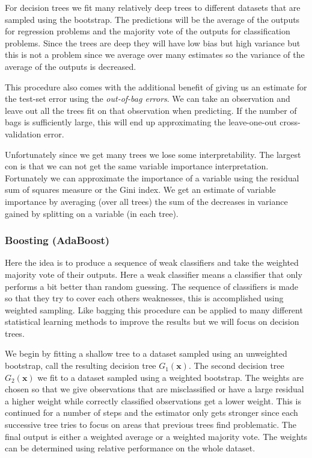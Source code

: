 \documentclass[a4paper, 12pt]{scrartcl}
\newcommand{\bfx}{\mathbf{x}}
\begin{document}
\begin{algorithm}
	For decision trees we fit many relatively deep trees to different datasets that are sampled using the bootstrap.
	The predictions will be the average of the outputs for regression problems and the majority vote of the outputs for classification problems.
	Since the trees are deep they will have low bias but high variance but this is not a problem since we average over many estimates so the variance of the average of the outputs is decreased.
	
	This procedure also comes with the additional benefit of giving us an estimate for the test-set error using the \emph{out-of-bag errors}.
	We can take an observation and leave out all the trees fit on that observation when predicting.
	If the number of bags is sufficiently large, this will end up approximating the leave-one-out cross-validation error.
\end{algorithm}

Unfortunately since we get many trees we lose some interpretability.
The largest con is that we can not get the same variable importance interpretation.
Fortunately we can approximate the importance of a variable using the residual sum of squares measure or the Gini index.
We get an estimate of variable importance by averaging (over all trees) the sum of the decreases in variance gained by splitting on a variable (in each tree).

\subsubsection*{Boosting (AdaBoost)}
Here the idea is to produce a sequence of weak classifiers and take the weighted majority vote of their outputs.
Here a weak classifier means a classifier that only performs a bit better than random guessing.
The sequence of classifiers is made so that they try to cover each others weaknesses, this is accomplished using weighted sampling.
Like bagging this procedure can be applied to many different statistical learning methods to improve the results but we will focus on decision trees.

\begin{algorithm}
	We begin by fitting a shallow tree to a dataset sampled using an unweighted bootstrap, call the resulting decision tree $G_1(\bfx)$.
	The second decision tree $G_2(\bfx)$ we fit to a dataset sampled using a weighted bootstrap.
	The weights are chosen so that we give observations that are misclassified or have a large residual a higher weight while correctly classified observations get a lower weight.
	This is continued for a number of steps and the estimator only gets stronger since each successive tree tries to focus on areas that previous trees find problematic.
	The final output is either a weighted average or a weighted majority vote.
	The weights can be determined using relative performance on the whole dataset.
\end{algorithm}
\end{document}
